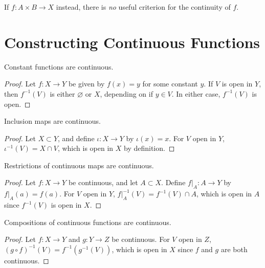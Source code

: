 \documentclass[10pt]{report}
\begin{document}
\begin{note}{}{}
	If $f:A\times B\to X$ instead, there is \textit{no} useful criterion for the continuity of $f$.
\end{note}


\section{Constructing Continuous Functions}

\begin{prop}
Constant functions are continuous.
\end{prop}
\begin{proof}
	Let $f:X\to Y$ be given by $f(x)=y$ for some constant $y$. If $V$ is open in $Y$, then $f^{-1}(V)$ is either $\varnothing$ or $X$, depending on if $y \in V$. In either case, $f^{-1}(V)$ is open.
\end{proof}

\begin{prop}
Inclusion maps are continuous.
\end{prop}
\begin{proof}
	Let $X \subset Y$, and define $\iota:X\to Y$ by $\iota(x)=x$. For $V$ open in $Y$, $\iota^{-1}(V)=X \cap V$, which is open in $X$ by definition.
\end{proof}

\begin{prop}
Restrictions of continuous maps are continuous.
\end{prop}
\begin{proof}
	Let $f:X\to Y$ be continuous, and let $A \subset X$. Define $f|_{A}:A\to Y$ by $f|_{A}(a)=f(a)$. For $V$ open in $Y$, $f|_{A}^{-1}(V) = f^{-1}(V) \cap A$, which is open in $A$ since $f^{-1}(V)$ is open in $X$.
\end{proof}

\begin{prop}
Compositions of continuous functions are continuous.
\end{prop}
\begin{proof}
	Let $f:X\to Y$ and $g:Y\to Z$ be continuous. For $V$ open in $Z$, $(g \circ f)^{-1}(V) = f^{-1}(g^{-1}(V))$, which is open in $X$ since $f$ and $g$ are both continuous.
\end{proof}
\end{document}
